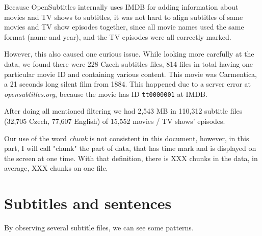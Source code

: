 Because OpenSubtitles internally uses IMDB for adding information about movies and TV shows to subtitles, it was not hard to align subtitles of same movies and TV show episodes together, since all movie names used the same format (name and year), and the TV episodes were all correctly marked.

However, this also caused one curious issue. While looking more carefully at the data, we found there were 228 Czech subtitles files, 814 files in total having one particular movie ID and containing various content. This movie was Carmentica, a 21 seconds long silent film from 1884. This happened due to a server error at \emph{opensubtitles.org}, because the movie has ID {\tt tt0000001} at IMDB.

After doing all mentioned filtering we had 2,543 MB in 110,312 subtitle files (32,705 Czech, 77,607 English) of 15,552 movies / TV shows' episodes.

Our use of the word \emph{chunk} is not consistent in this document, however, in this part, I will call "chunk" the part of data, that has time mark and is displayed on the screen at one time. With that definition, there is XXX chunks in the data, in average, XXX chunks on one file.

\section{Subtitles and sentences}

By observing several subtitle files, we can see some patterns. 

